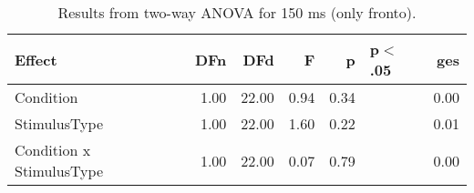 \begin{table}[ht]
\centering
\begin{tabulary}{\textwidth}{lrrrrlr}
  \toprule
Effect & DFn & DFd & F & p & p$<$.05 & ges \\ 
  \midrule
Condition & 1.00 & 22.00 & 0.94 & 0.34 &  & 0.00 \\ 
  StimulusType & 1.00 & 22.00 & 1.60 & 0.22 &  & 0.01 \\ 
  Condition x StimulusType & 1.00 & 22.00 & 0.07 & 0.79 &  & 0.00 \\ 
   \bottomrule
\end{tabulary}
\caption{Results from two-way ANOVA for 150 ms (only fronto).} 
\end{table}
